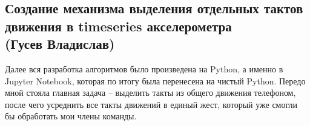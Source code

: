 




\subsection{Создание механизма выделения отдельных тактов движения в timeseries акселерометра \\ (Гусев Владислав)}

Далее вся разработка алгоритмов было произведена на Python, а именно в Jupyter Notebook, которая по итогу была перенесена на чистый Python.
Передо мной стояла главная задача -- выделить такты из общего движения телефоном, после чего усреднить все такты движений в единый жест, который уже смогли бы обработать мои члены команды.

